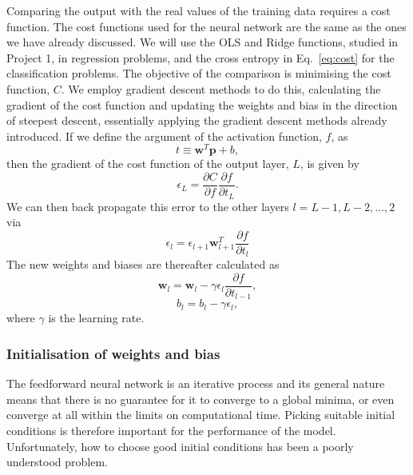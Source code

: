 \documentclass[a4paper,
amsfonts,
amssymb,
amsmath,
reprint,
showkeys,
nofootinbib,
twoside]{revtex4-2}
\begin{document}
Comparing the output with the real values of the training data requires a cost function. The cost functions used for the neural network are the same as the ones we have already discussed. We will use the OLS and Ridge functions, studied in Project 1, in regression problems, and the cross entropy in Eq.~\eqref{eq:cost} for the classification problems.
The objective of the comparison is minimising the cost function, $C$. We employ gradient descent methods to do this, calculating the gradient of the cost function and updating the weights and bias in the direction of steepest descent, essentially applying the gradient descent methods already introduced. If we define the argument of the activation function, $f$, as
\begin{equation}
    t \equiv \mathbf{w}^T \mathbf{p} + b,
\end{equation}
then the gradient of the cost function of the output layer, $L$, is given by
\begin{equation}
    \epsilon_L = \frac{\partial C}{\partial f} \frac{\partial f}{\partial t_L}.
\end{equation}
We can then back propagate this error to the other layers $l = L- 1, L-2, ... , 2$ via
\begin{equation}
    \epsilon_l = \epsilon_{l+1} \mathbf{w}^T_{l+1} \frac{\partial f}{\partial t_l}
\end{equation}
The new weights and biases are thereafter calculated as \begin{equation}
    \mathbf{w}_l = \mathbf{w}_l - \gamma \epsilon_l \frac{\partial f}{\partial t_{l-1}},
\end{equation}
\begin{equation}
    b_l = b_l - \gamma \epsilon_l,
\end{equation}
where $\gamma$ is the learning rate.

\subsubsection{Initialisation of weights and bias}

The feedforward neural network is an iterative process and its general nature means that there is no guarantee for it to converge to a global minima, or even converge at all within the limits on computational time. Picking suitable initial conditions is therefore important for the performance of the model. Unfortunately, how to choose good initial conditions has been a poorly understood problem\cite{gbc16}.
\end{document}
